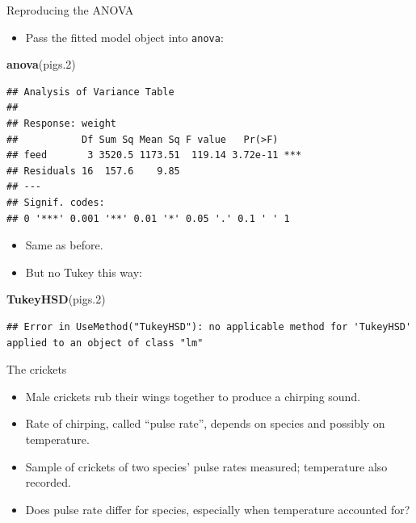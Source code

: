 \documentclass[
  ignorenonframetext,
]{beamer}
\newenvironment{Shaded}{\begin{snugshade}}{\end{snugshade}}
\newcommand{\FloatTok}[1]{\textcolor[rgb]{0.00,0.00,0.81}{#1}}
\newcommand{\KeywordTok}[1]{\textcolor[rgb]{0.13,0.29,0.53}{\textbf{#1}}}
\newcommand{\NormalTok}[1]{#1}
\providecommand{\tightlist}{%
  \setlength{\itemsep}{0pt}\setlength{\parskip}{0pt}}
\begin{document}
\begin{frame}[fragile]{Reproducing the ANOVA}
\protect\hypertarget{reproducing-the-anova}{}

\begin{itemize}
\tightlist
\item
  Pass the fitted model object into \texttt{anova}:
\end{itemize}

\footnotesize

\begin{Shaded}
\begin{Highlighting}[]
\KeywordTok{anova}\NormalTok{(pigs}\FloatTok{.2}\NormalTok{)}
\end{Highlighting}
\end{Shaded}

\begin{verbatim}
## Analysis of Variance Table
## 
## Response: weight
##           Df Sum Sq Mean Sq F value   Pr(>F)    
## feed       3 3520.5 1173.51  119.14 3.72e-11 ***
## Residuals 16  157.6    9.85                     
## ---
## Signif. codes:  
## 0 '***' 0.001 '**' 0.01 '*' 0.05 '.' 0.1 ' ' 1
\end{verbatim}

\normalsize

\begin{itemize}
\tightlist
\item
  Same as before.
\item
  But no Tukey this way:
\end{itemize}

\footnotesize

\begin{Shaded}
\begin{Highlighting}[]
\KeywordTok{TukeyHSD}\NormalTok{(pigs}\FloatTok{.2}\NormalTok{)}
\end{Highlighting}
\end{Shaded}

\begin{verbatim}
## Error in UseMethod("TukeyHSD"): no applicable method for 'TukeyHSD' applied to an object of class "lm"
\end{verbatim}

\normalsize

\end{frame}

\begin{frame}{The crickets}
\protect\hypertarget{the-crickets}{}

\begin{itemize}
\tightlist
\item
  Male crickets rub their wings together to produce a chirping sound.
\item
  Rate of chirping, called ``pulse rate'', depends on species and
  possibly on temperature.
\item
  Sample of crickets of two species' pulse rates measured; temperature
  also recorded.
\item
  Does pulse rate differ for species, especially when temperature
  accounted for?
\end{itemize}

\end{frame}
\end{document}
